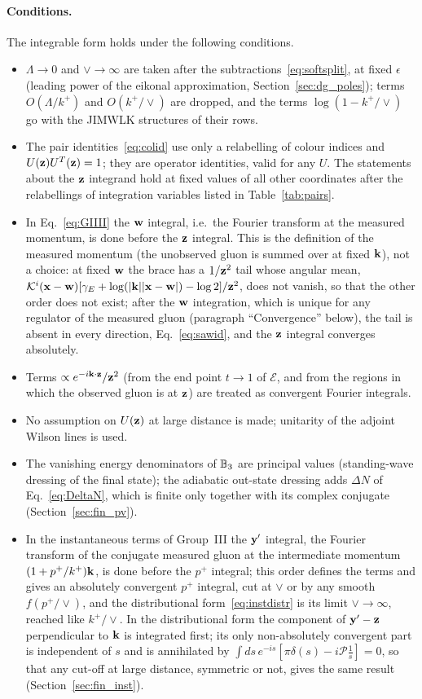\paragraph{Conditions.} The integrable form holds under the following conditions.
\begin{itemize}
\item[(C1)] $\Lambda\to0$ and $\vee\to\infty$ are taken after the subtractions~\eqref{eq:softsplit}, at fixed $\epsilon$ (leading power of the eikonal approximation, Section~\ref{sec:dg_poles}); terms $O(\Lambda/k^+)$ and $O(k^+/\vee)$ are dropped, and the terms $\log(1-k^+/\vee)$ go with the JIMWLK structures of their rows.
\item[(C2)] The pair identities~\eqref{eq:colid} use only a relabelling of colour indices and $U(\mathbf{z})U^T(\mathbf{z})=1$; they are operator identities, valid for any $U$. The statements about the $\mathbf{z}$ integrand hold at fixed values of all other coordinates after the relabellings of integration variables listed in Table~\ref{tab:pairs}.
\item[(C3)] In Eq.~\eqref{eq:GIIII} the $\mathbf{w}$ integral, i.e.\ the Fourier transform at the measured momentum, is done before the $\mathbf{z}$ integral. This is the definition of the measured momentum (the unobserved gluon is summed over at fixed $\mathbf{k}$), not a choice: at fixed $\mathbf{w}$ the brace has a $1/\mathbf{z}^2$ tail whose angular mean, $\mathcal{K}^i(\mathbf{x}-\mathbf{w})[\gamma_E+\log(|\mathbf{k}||\mathbf{x}-\mathbf{w}|)-\log2]/\mathbf{z}^2$, does not vanish, so that the other order does not exist; after the $\mathbf{w}$ integration, which is unique for any regulator of the measured gluon (paragraph ``Convergence'' below), the tail is absent in every direction, Eq.~\eqref{eq:sawid}, and the $\mathbf{z}$ integral converges absolutely.
\item[(C4)] Terms $\propto e^{-i\mathbf{k}\cdot\mathbf{z}}/\mathbf{z}^2$ (from the end point $t\to1$ of $\mathcal E$, and from the regions in which the observed gluon is at $\mathbf{z}$) are treated as convergent Fourier integrals.
\item[(C5)] No assumption on $U(\mathbf{z})$ at large distance is made; unitarity of the adjoint Wilson lines is used.
\item[(C6)] The vanishing energy denominators of $\mathbb{B}_3$ are principal values (standing-wave dressing of the final state); the adiabatic out-state dressing adds $\Delta N$ of Eq.~\eqref{eq:DeltaN}, which is finite only together with its complex conjugate (Section~\ref{sec:fin_pv}).
\item[(C7)] In the instantaneous terms of Group~III the $\mathbf{y}'$ integral, the Fourier transform of the conjugate measured gluon at the intermediate momentum $(1+p^+/k^+)\mathbf{k}$, is done before the $p^+$ integral; this order defines the terms and gives an absolutely convergent $p^+$ integral, cut at $\vee$ or by any smooth $f(p^+/\vee)$, and the distributional form~\eqref{eq:instdistr} is its limit $\vee\to\infty$, reached like $k^+/\vee$. In the distributional form the component of $\mathbf{y}'-\mathbf{z}$ perpendicular to $\mathbf{k}$ is integrated first; its only non-absolutely convergent part is independent of $s$ and is annihilated by $\int ds\,e^{-is}[\pi\delta(s)-i\mathcal P\frac1s]=0$, so that any cut-off at large distance, symmetric or not, gives the same result (Section~\ref{sec:fin_inst}).

\end{itemize}
